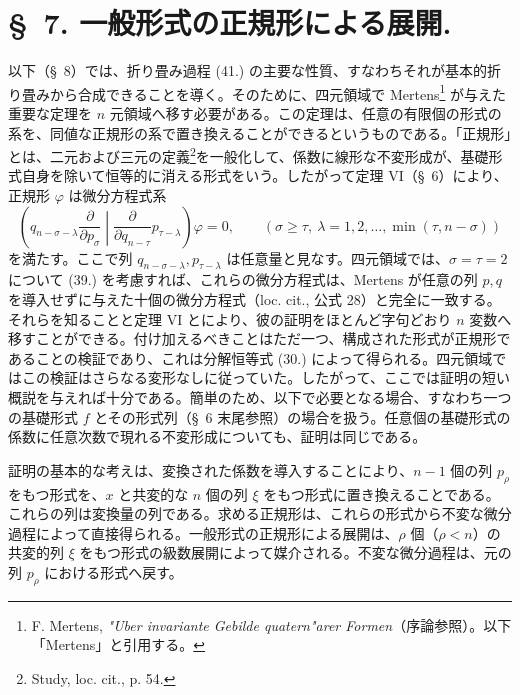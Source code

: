 \documentclass[11pt]{article}
\begin{document}
\section*{\S\ 7. 一般形式の正規形による展開.}
以下（\S\ 8）では、折り畳み過程 (41.) の主要な性質、すなわちそれが基本的折り畳みから合成できることを導く。そのために、四元領域で Mertens\footnote{F. Mertens, \emph{"Uber invariante Gebilde quatern"arer Formen}（序論参照）。以下「Mertens」と引用する。} が与えた重要な定理を $n$ 元領域へ移す必要がある。この定理は、任意の有限個の形式の系を、同値な正規形の系で置き換えることができるというものである。「正規形」とは、二元および三元の定義\footnote{Study, loc. cit., p. 54.}を一般化して、係数に線形な不変形成が、基礎形式自身を除いて恒等的に消える形式をいう。したがって定理 VI（\S\ 6）により、正規形 $\varphi$ は微分方程式系
\begin{equation}
 \left(q_{n-\sigma-\lambda}\frac{\partial}{\partial p_\sigma}\middle|\frac{\partial}{\partial q_{n-\tau}}p_{\tau-\lambda}\right)\varphi=0,
 \qquad(\sigma\ge\tau,\ \lambda=1,2,\ldots,\min(\tau,n-\sigma))
\tag{46}
\end{equation}
を満たす。ここで列 $q_{n-\sigma-\lambda},p_{\tau-\lambda}$ は任意量と見なす。四元領域では、$\sigma=\tau=2$ について (39.) を考慮すれば、これらの微分方程式は、Mertens が任意の列 $p,q$ を導入せずに与えた十個の微分方程式（loc. cit., 公式 28）と完全に一致する。それらを知ることと定理 VI とにより、彼の証明をほとんど字句どおり $n$ 変数へ移すことができる。付け加えるべきことはただ一つ、構成された形式が正規形であることの検証であり、これは分解恒等式 (30.) によって得られる。四元領域ではこの検証はさらなる変形なしに従っていた。したがって、ここでは証明の短い概説を与えれば十分である。簡単のため、以下で必要となる場合、すなわち一つの基礎形式 $f$ とその形式列（\S\ 6 末尾参照）の場合を扱う。任意個の基礎形式の係数に任意次数で現れる不変形成についても、証明は同じである。

証明の基本的な考えは、変換された係数を導入することにより、$n-1$ 個の列 $p_\rho$ をもつ形式を、$x$ と共変的な $n$ 個の列 $\xi$ をもつ形式に置き換えることである。これらの列は変換量の列である。求める正規形は、これらの形式から不変な微分過程によって直接得られる。一般形式の正規形による展開は、$\rho$ 個（$\rho<n$）の共変的列 $\xi$ をもつ形式の級数展開によって媒介される。不変な微分過程は、元の列 $p_\rho$ における形式へ戻す。
\end{document}
